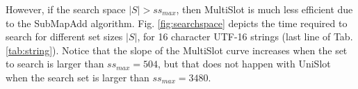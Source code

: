\begin{comment}
\begin{figure}[htbp]

\centering
\begin{tikzpicture}[scale=0.7]
\begin{axis}[
    xlabel={Plain Text Size (bits)($\log_2{p}$)},
    ylabel={Time [s]},
    xmin=8, xmax=16,
    ymin=0, ymax=65,
    xtick={2,4,6,8,10,12,14,16},
    ytick={0,20,40,60},
    legend pos=north west,
    ymajorgrids=true,
    grid style=dashed,
]

\addplot[
    color=blue,
    mark=square,
    ]
    coordinates {
        (8,24.954)(9,28.7115)(10,22.2222)(16,64.215)
    };

\addplot[
    color=red,
    mark=*,
    ]
    coordinates {
    (8,21.7776)(9,17.4891)(10,14.0714)(16,55.2358)
    };
\legend{Uni Slot, Multi Slot}
    
\end{axis}
\end{tikzpicture}
\caption{PSM efficiency with plaintext size.}
\label{fig:string}
\end{figure}
\end{comment}

However, if the search space $|S|>ss_{max}$, then {\sc MultiSlot} is much less efficient due to the {\sc SubMapAdd} algorithm. Fig. \ref{fig:searchspace} depicts the time required to search for different set sizes $|S|$, for 16 character UTF-16 strings (last line of Tab. \ref{tab:string}). Notice that the slope of the {\sc MultiSlot} curve increases when the set to search is larger than $ss_{max}=504$, but that does not happen with {\sc UniSlot} when the search set is larger than $ss_{max}=3480$.

\begin{comment}
\begin{figure}[htbp]
\centering
\begin{tikzpicture}[scale=0.7]
\begin{loglogaxis}[
    xlabel={Number of strings to search},
    ylabel={Time [s]},
    xmin=10, xmax=6000,
    ymin=30, ymax=310,
    log ticks with fixed point,
    xtick={10,50,250,500,1500,6000},
    ytick={50,75,150,300},
    legend pos=north west,
    ymajorgrids=true,
    grid style=dashed,
]

\addplot[
    color=blue,
    mark=square,
    ]
    coordinates {
        (10,53.42)(50,61)(250,75.4)(500,76.81)(1500,84.97)(3000,85)(6000,86.69)
    };

\addplot[
    color=red,
    mark=*,
    ]
    coordinates {
    (10,34.45)(50,40.16)(250,51.39)(500,55.06)(1500,100.29)(3000,166.41)(6000,309.51)
    };

\legend{Uni Slot, Multi Slot}
    
\end{loglogaxis}
\draw [red,dashed] (4.3,0) -- (4.3,5.75);
\draw [blue,dashed] (6.2,0) -- (6.2,5.75);
\end{tikzpicture}
\caption{MultiSlot vs UniSlot PSM efficiency with set size.}
\label{fig:searchspace}
\end{figure}
\end{comment}